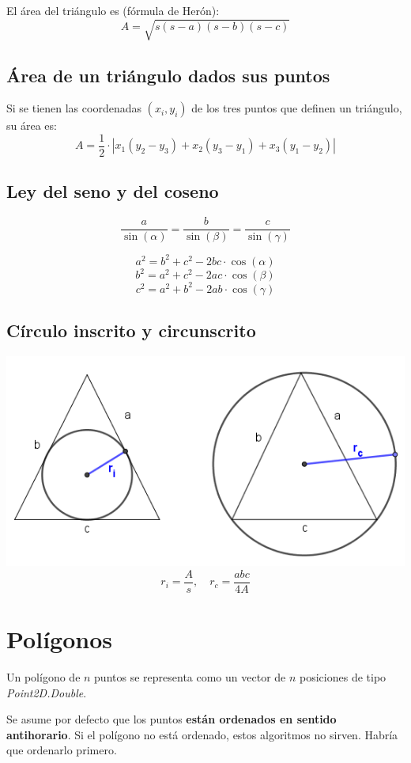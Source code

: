 \documentclass{article}
\begin{document}
\begin{multicols}{2}
El área del triángulo es (fórmula de Herón):
\[ A = \sqrt{s(s-a)(s-b)(s-c)} \]

\subsection{Área de un triángulo dados sus puntos}
Si se tienen las coordenadas \( (x_i, y_i) \) de los tres puntos que definen un triángulo, su área es:
\[ A = \frac{1}{2} \cdot | x_1(y_2-y_3) + x_2(y_3-y_1) + x_3(y_1-y_2) | \]

\subsection{Ley del seno y del coseno}
\[ \frac{a}{\sin(\alpha)} = \frac{b}{\sin(\beta)} = \frac{c}{\sin(\gamma)} \]

\[ a^2 = b^2 + c^2 - 2bc \cdot \cos(\alpha) \]
\[ b^2 = a^2 + c^2 - 2ac \cdot \cos(\beta) \]
\[ c^2 = a^2 + b^2 - 2ab \cdot \cos(\gamma) \]

\subsection{Círculo inscrito y circunscrito}
\includegraphics[width=0.8\columnwidth]{inscrito-circunscrito}
\[ r_i = \frac{A}{s}, \quad r_c = \frac{abc}{4A} \]


\section{Polígonos}
Un polígono de \( n \) puntos se representa como un vector de \( n \) posiciones de tipo \emph{Point2D.Double}.

Se asume por defecto que los puntos {\bf están ordenados en sentido antihorario}. Si el polígono no está ordenado, estos algoritmos no sirven. Habría que ordenarlo primero.


\end{multicols}
\end{document}
